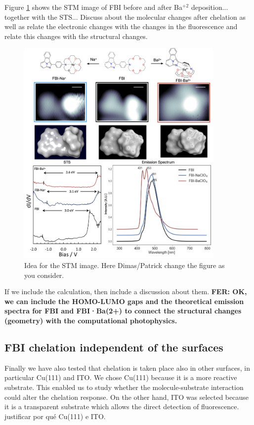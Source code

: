 \documentclass[aps,prl,reprint,longbibliography,superscriptaddress]{revtex4-1}
\def\Ba{Ba$^{+2}$ }
\newcommand{\completar}[1]{{\color{red} #1}}
\begin{document}
Figure \ref{STM_chelation} shows the STM image of FBI before and after \Ba deposition... together with the STS... \completar{Discuss about the molecular changes after chelation as well as relate the electronic changes with the changes in the fluorescence and relate this changes with the structural changes.}

\begin{figure}[ht!]
	\includegraphics[width=0.9\textwidth]{figures/fig4_stm_chelation.png}
	\caption{\label{STM_chelation} 
    Idea for the STM image. Here Dimas/Patrick change the figure as you consider. }
\end{figure}  

\completar{If we include the calculation, then include a discussion about them.\textbf{ FER: OK, we can include the HOMO-LUMO gaps and the theoretical emission spectra for FBI and FBI·Ba(2+) to connect the structural changes (geometry) with the computational photophysics.}}

\subsection{FBI chelation independent of the surfaces}

Finally we have also tested that chelation is taken place also in other surfaces, in particular Cu(111) and ITO. We chose Cu(111) because it is a more reactive substrate. This enabled us to study whether the molecule-substrate interaction could alter the chelation response. On the other hand, ITO was selected because it is a transparent substrate which allows the direct detection of fluorescence. \completar{justificar por qué Cu(111) e ITO}. 
\end{document}
